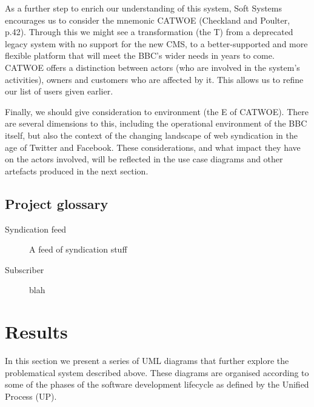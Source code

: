 \documentclass{article}
\begin{document}
As a further step to enrich our understanding of this system, Soft Systems encourages us to consider the mnemonic CATWOE (Checkland and Poulter, p.42). Through this we might see a transformation (the T) from a deprecated legacy system with no support for the new CMS, to a better-supported and more flexible platform that will meet the BBC's wider needs in years to come. CATWOE offers a distinction between actors (who are involved in the system's activities), owners and customers who are affected by it. This allows us to refine our list of users given earlier.

Finally, we should give consideration to environment (the E of CATWOE). There are several dimensions to this, including the operational environment of the BBC itself, but also the context of the changing landscape of web syndication in the age of Twitter and Facebook. These considerations, and what impact they have on the actors involved, will be reflected in the use case diagrams and other artefacts produced in the next section.




\subsection{Project glossary}

\begin{description}

\item [Syndication feed]
A feed of syndication stuff

\item [Subscriber]
blah

\end{description}

\section{Results}

In this section we present a series of UML diagrams that further explore the problematical system described above. These diagrams are organised according to some of the phases of the software development lifecycle as defined by the Unified Process (UP).
\end{document}
